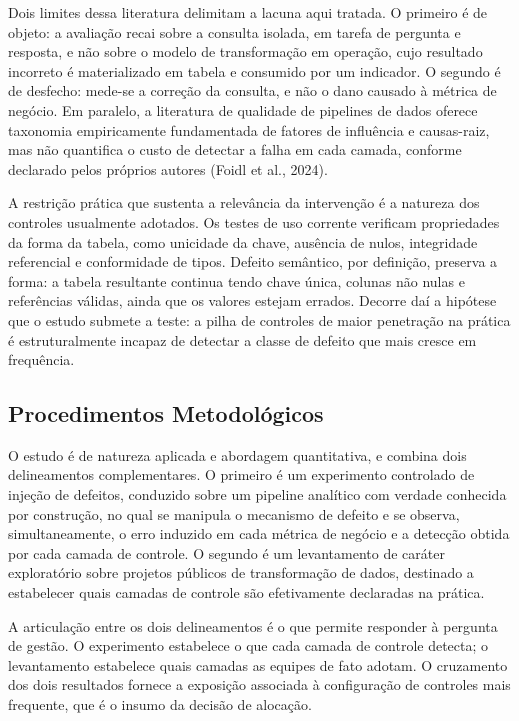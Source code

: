 \documentclass[11pt,a4paper]{article}
\begin{document}
Dois limites dessa literatura delimitam a lacuna aqui tratada. O primeiro
é de objeto: a avaliação recai sobre a consulta isolada, em tarefa de
pergunta e resposta, e não sobre o modelo de transformação em operação,
cujo resultado incorreto é materializado em tabela e consumido por um
indicador. O segundo é de desfecho: mede-se a correção da consulta, e não
o dano causado à métrica de negócio. Em paralelo, a literatura de
qualidade de pipelines de dados oferece taxonomia empiricamente
fundamentada de fatores de influência e causas-raiz, mas não quantifica o
custo de detectar a falha em cada camada, conforme declarado pelos
próprios autores (Foidl et al., 2024).

A restrição prática que sustenta a relevância da intervenção é a natureza
dos controles usualmente adotados. Os testes de uso corrente verificam
propriedades da forma da tabela, como unicidade da chave, ausência de
nulos, integridade referencial e conformidade de tipos. Defeito semântico,
por definição, preserva a forma: a tabela resultante continua tendo chave
única, colunas não nulas e referências válidas, ainda que os valores
estejam errados. Decorre daí a hipótese que o estudo submete a teste: a
pilha de controles de maior penetração na prática é estruturalmente
incapaz de detectar a classe de defeito que mais cresce em frequência.

\subsection{Procedimentos Metodológicos}

O estudo é de natureza aplicada e abordagem quantitativa, e combina dois
delineamentos complementares. O primeiro é um experimento controlado de
injeção de defeitos, conduzido sobre um pipeline analítico com verdade
conhecida por construção, no qual se manipula o mecanismo de defeito e se
observa, simultaneamente, o erro induzido em cada métrica de negócio e a
detecção obtida por cada camada de controle. O segundo é um levantamento
de caráter exploratório sobre projetos públicos de transformação de dados,
destinado a estabelecer quais camadas de controle são efetivamente
declaradas na prática.

A articulação entre os dois delineamentos é o que permite responder à
pergunta de gestão. O experimento estabelece o que cada camada de controle
detecta; o levantamento estabelece quais camadas as equipes de fato
adotam. O cruzamento dos dois resultados fornece a exposição associada à
configuração de controles mais frequente, que é o insumo da decisão de
alocação.
\end{document}
